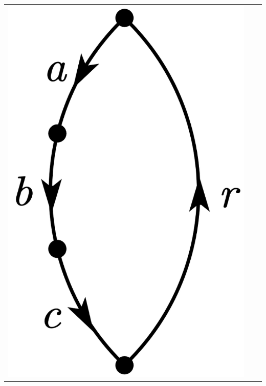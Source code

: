 \documentclass[a4paper]{book}
\newcounter{solution}[chapter]
\begin{document}
\begin{solution}
\begin{itemize}
\begin{center}
\begin{tabular}{ccc}
		\begin{minipage}{0.22\linewidth}
		\centering
		\includegraphics[scale=1.0,trim=0 -4 0 -4]{./pictures/6.07/diagram_2.png}
		\end{minipage} &
		

\end{tabular}
\end{center}
\end{itemize}
\end{solution}
\end{document}
